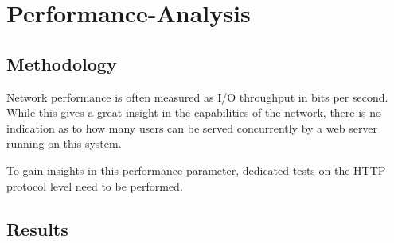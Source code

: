 \chapter{Performance-Analysis}

\section{Methodology}

Network performance is often measured as I/O throughput in bits per second. While this gives a great insight in the capabilities of the network, there is no indication as to how many users can be served concurrently by a web server running on this system.

To gain insights in this performance parameter, dedicated tests on the HTTP protocol level need to be performed.

\section{Results}
